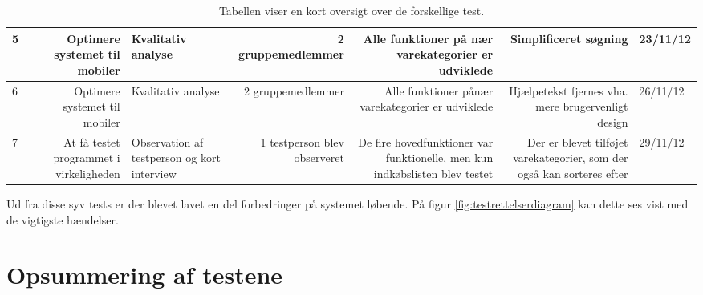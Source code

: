 \begin{table}[H]
\begin{adjustwidth}{-50pt}{50pt}
\begin{tabularx}{\textwidth + 100pt}{|l|R|p{1.7cm}|R|R|R|p{1.5cm}|}
5 & Optimere systemet til mobiler & Kvalitativ analyse  & 2 gruppemedlemmer & Alle funktioner på nær varekategorier er udviklede & Simplificeret søgning & 23/11/12 \\ \hline

6 & Optimere systemet til mobiler  & Kvalitativ analyse  & 2 gruppemedlemmer & Alle funktioner pånær varekategorier er udviklede & Hjælpetekst fjernes vha. mere brugervenligt design & 26/11/12 \\ \hline

7 & At få testet programmet i virkeligheden & \hspace{0pt}Observation af testperson og kort interview & 1 testperson blev observeret & De fire hovedfunktioner var funktionelle, men kun indkøbslisten blev testet &  Der er blevet tilføjet varekategorier, som der også kan sorteres efter & 29/11/12 \\ \hline

\end{tabularx}
\end{adjustwidth}
\caption{Tabellen viser en kort oversigt over de forskellige test. \label{tab:testoversigt}}

\end{table}

Ud fra disse syv tests er der blevet lavet en del forbedringer på systemet løbende. På figur \ref{fig:testrettelserdiagram} kan dette ses vist med de vigtigste hændelser.














\section{Opsummering af testene}

